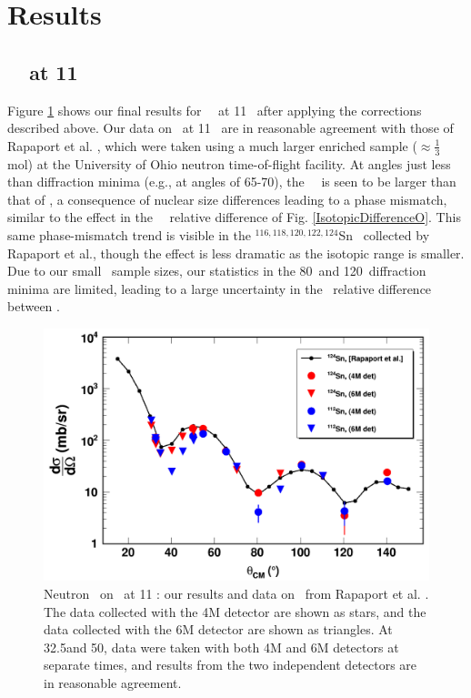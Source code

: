 \section{Results}
\subsection{\snTwelveFour\ \el\ at 11 \mega\electronvolt}
Figure \ref{SnECS_11MeV} shows our final results for \snTwelveFour\
\el\ at 11 \mega\electronvolt\ after applying the corrections described above. Our data on \snFour\
at 11 \mega\electronvolt\ are in reasonable agreement with those of Rapaport et al.
\cite{Rapaport1980}, which were taken using a much larger enriched sample
($\approx\frac{1}{3}$ mol) at the University of Ohio neutron time-of-flight
facility. At angles just less than diffraction minima (e.g., at
angles of 65-70\textdegree), the \snTwelve\ \el\ is seen to be larger
than that of \snFour, a consequence of nuclear size
differences leading to a phase mismatch, similar to the effect in the \oSixEight\
\tot\ relative difference of Fig. \ref{IsotopicDifferenceO}. This same
phase-mismatch trend is
visible in the $^{116,118,120,122,124}$Sn \el\ collected by Rapaport et al.,
though the effect is less dramatic as the isotopic range is smaller.
Due to our small \snTwelveFour\ sample sizes,
our statistics in the 80\textdegree\ and 120\textdegree\ diffraction minima are
limited, leading to a large uncertainty in the \el\ relative difference between
\snTwelveFour.

\begin{figure}[tb]
    \centering
    \includegraphics[width = 1.0\textwidth]{figures/ECSResults2017.png}
    \caption[Neutron \el\ on \snTwelveFour\ at 11 \mega\electronvolt: our results and literature data]
    {
        Neutron \el\ on \snTwelveFour\ at 11 \mega\electronvolt: our results and data on
        \snFour\ from Rapaport et al. \cite{Rapaport1980}. The data collected
        with the 4M detector are shown as stars, and the data collected
        with the 6M detector are shown as triangles. At 32.5\textdegree and
        50\textdegree, data were taken with both 4M and 6M detectors at separate
        times, and results from the two independent detectors are in reasonable agreement.
    }
    \label{SnECS_11MeV}
\end{figure}

